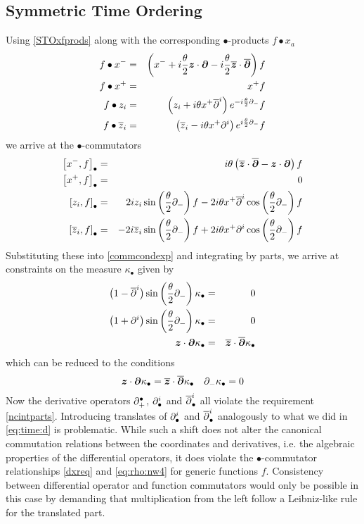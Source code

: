 \subsection{Symmetric Time Ordering}
\label{STOint}
Using \eqref{STOxfprods} along with the corresponding $\bullet$-products
$f\bullet x_a$
\begin{eqnarray}
  \label{eq:symtime:starx}
  f\bullet x^-&=& \left(x^-+i\frac \theta 2{{\boldsymbol {z} }}\cdot{{\boldsymbol {\partial} }}
    -i\frac \theta 2\overline{{\boldsymbol {z} }}\cdot\overline{{\boldsymbol {\partial} }}\right) f\\ \nonumber
  f\bullet x^+&=&x^+f\\ \nonumber
  f\bullet z_i&=&\left(z_i+i\theta x^+\overline{\partial}^i\right)
        e^{-i\frac \theta 2 \partial_-}f\\ \nonumber
  f\bullet \overline{z}_i&=&\left(\overline{z}_i-i\theta x^+\partial^i\right)
        e^{i\frac \theta 2 \partial_-}f
\end{eqnarray}
we arrive at the $\bullet$-commutators
\begin{eqnarray}
  \label{eq:symtime:comm}
  \left[x^-,f\right]_\bullet&=&i \theta \left( 
    \overline{{\boldsymbol {z} }}\cdot\overline{{\boldsymbol {\partial} }} -{{\boldsymbol {z} }}\cdot{{\boldsymbol {\partial} }}\right)f   \\ \nonumber
  \left[x^+,f\right]_\bullet&=&0   \\ \nonumber
  \left[z_i,f\right]_\bullet&=& 2iz_i \sin\left( \frac\theta2 \partial_- \right)f-2i
  \theta x^+ \overline{\partial}^{ i}
  \cos\left( \frac\theta2 \partial_-\right)f   \\
  \left[ \overline{z}_i,f\right]_\bullet&=&-2i \overline{z}_i \sin\left( \frac\theta2
    \partial_-\right)f+2i \theta x^+\partial^i\cos
  \left( \frac\theta2 \partial_-\right)f 
\end{eqnarray}
Substituting these into \eqref{commcondexp} and integrating by parts, we arrive
at constraints on the measure $\kappa_\bullet$ given by
\begin{eqnarray}
  \label{eq:symtime:mu:all}
  \bigl(1-\overline{\partial}^{ i}\bigr)\sin\left( \frac\theta2
    \partial_-\right)\kappa_\bullet&=&0   \\ \nonumber
  \bigl(1+\partial^i\bigr)\sin\left( \frac\theta2
    \partial_-\right)\kappa_\bullet&=&0   \\
  {{\boldsymbol {z} }}\cdot{{\boldsymbol {\partial} }}\kappa_\bullet&=&\overline{{\boldsymbol {z} }}\cdot\overline{{\boldsymbol {\partial} }}\kappa_\bullet \nonumber
\end{eqnarray}
which can be reduced to the conditions
\begin{equation}
  \label{eq:symtime:mu:rest}
  {{\boldsymbol {z} }}\cdot{{\boldsymbol {\partial} }}\kappa_\bullet=\overline{{\boldsymbol {z} }}\cdot\overline{{\boldsymbol {\partial} }}\kappa_\bullet  
  \quad \partial_-\kappa_\bullet=0 
\end{equation}
Now the derivative operators $\partial_+^\bullet$, $\partial^i_\bullet$ and $\overline{\partial}^{
  i}_\bullet$ all violate the requirement \eqref{ncintparts}. Introducing
translates of $\partial^i_\bullet$ and $\overline{\partial}^{ i}_\bullet$ analogously to what we did
in \eqref{eq:time:d} is problematic. While such a shift does not alter the
canonical commutation relations between the coordinates and derivatives, i.e.
the algebraic properties of the differential operators, it does violate the
$\bullet$-commutator relationships \eqref{dxreq} and \eqref{eq:rho:nw4} for
generic functions $f$. Consistency between differential operator and function
commutators would only be possible in this case by demanding that multiplication
from the left follow a Leibniz-like rule for the translated part.

